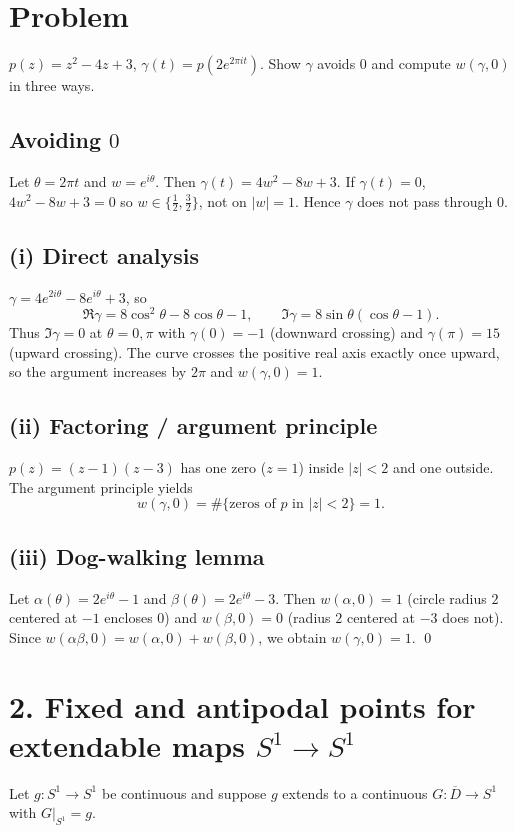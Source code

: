 \documentclass[11pt,a4paper]{article}
\theoremstyle{definition}
\theoremstyle{definition}
\theoremstyle{plain}
\theoremstyle{remark}
\begin{document}
\section*{Problem}
$p(z)=z^2-4z+3$, $\gamma(t)=p(2e^{2\pi it})$. Show $\gamma$ avoids $0$ and compute $w(\gamma,0)$ in three ways.

\subsection*{Avoiding $0$}
Let $\theta=2\pi t$ and $w=e^{i\theta}$. Then $\gamma(t)=4w^2-8w+3$. If $\gamma(t)=0$,
$4w^2-8w+3=0$ so $w\in\{\tfrac12,\tfrac32\}$, not on $|w|=1$. Hence $\gamma$ does not pass through $0$.

\subsection*{(i) Direct analysis}
$\gamma=4e^{2i\theta}-8e^{i\theta}+3$, so
\[
\Re\gamma=8\cos^2\theta-8\cos\theta-1,\qquad
\Im\gamma=8\sin\theta(\cos\theta-1).
\]
Thus $\Im\gamma=0$ at $\theta=0,\pi$ with $\gamma(0)=-1$ (downward crossing) and $\gamma(\pi)=15$ (upward crossing).
The curve crosses the positive real axis exactly once upward, so the argument increases by $2\pi$ and
$w(\gamma,0)=1$.

\subsection*{(ii) Factoring / argument principle}
$p(z)=(z-1)(z-3)$ has one zero ($z=1$) inside $|z|<2$ and one outside. The argument principle yields
\[
w(\gamma,0)=\#\{\text{zeros of }p \text{ in }|z|<2\}=1.
\]

\subsection*{(iii) Dog-walking lemma}
Let $\alpha(\theta)=2e^{i\theta}-1$ and $\beta(\theta)=2e^{i\theta}-3$. Then $w(\alpha,0)=1$ (circle radius $2$ centered at $-1$
encloses $0$) and $w(\beta,0)=0$ (radius $2$ centered at $-3$ does not). Since $w(\alpha\beta,0)=w(\alpha,0)+w(\beta,0)$,
we obtain $w(\gamma,0)=1$.
\qed

\section*{2. Fixed and antipodal points for extendable maps $S^1\to S^1$}

Let $g:S^1\to S^1$ be continuous and suppose $g$ extends to a continuous
$G:\overline{D}\to S^1$ with $G|_{S^1}=g$.
\end{document}
